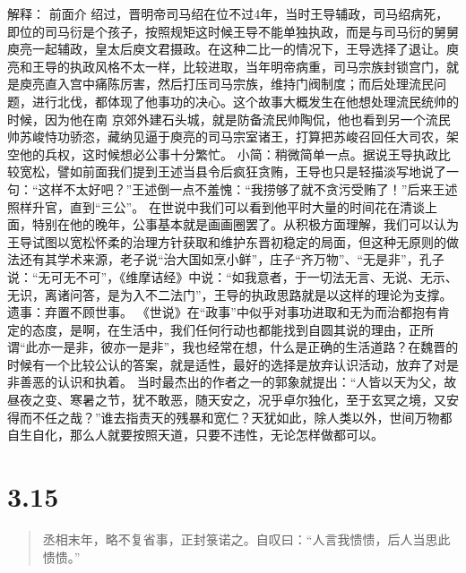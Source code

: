 \documentclass[]{book}
\begin{document}
解释： 前面介
绍过，晋明帝司马绍在位不过4年，当时王导辅政，司马绍病死，即位的司马衍是个孩子，按照规矩这时候王导不能单独执政，而是与司马衍的舅舅庾亮一起辅政，皇太后庾文君摄政。在这种二比一的情况下，王导选择了退让。庾亮和王导的执政风格不太一样，比较进取，当年明帝病重，司马宗族封锁宫门，就是庾亮直入宫中痛陈厉害，然后打压司马宗族，维持门阀制度；而后处理流民问题，进行北伐，都体现了他事功的决心。这个故事大概发生在他想处理流民统帅的时候，因为他在南
京郊外建石头城，就是防备流民帅陶侃，他也看到另一个流民帅苏峻恃功骄恣，藏纳见逼于庾亮的司马宗室诸王，打算把苏峻召回任大司农，架空他的兵权，这时候想必公事十分繁忙。
小简：稍微简单一点。据说王导执政比较宽松，譬如前面我们提到王述当县令后疯狂贪贿，王导也只是轻描淡写地说了一句：``这样不太好吧？''王述倒一点不羞愧：``我捞够了就不贪污受贿了！''后来王述照样升官，直到``三公''。
在世说中我们可以看到他平时大量的时间花在清谈上面，特别在他的晚年，公事基本就是画画圈罢了。从积极方面理解，我们可以认为王导试图以宽松怀柔的治理方针获取和维护东晋初稳定的局面，但这种无原则的做法还有其学术来源，老子说``治大国如烹小鲜''，庄子``齐万物''、``无是非''，孔子说：``无可无不可''，《维摩诘经》中说：``如我意者，于一切法无言、无说、无示、无识，离诸问答，是为入不二法门''，王导的执政思路就是以这样的理论为支撑。
遗事：弃置不顾世事。
《世说》在``政事''中似乎对事功进取和无为而治都抱有肯定的态度，是啊，在生活中，我们任何行动也都能找到自圆其说的理由，正所谓``此亦一是非，彼亦一是非''，我也经常在想，什么是正确的生活道路？在魏晋的时候有一个比较公认的答案，就是适性，最好的选择是放弃认识活动，放弃了对是非善恶的认识和执着。
当时最杰出的作者之一的郭象就提出：``人皆以天为父，故昼夜之变、寒暑之节，犹不敢恶，随天安之，况乎卓尔独化，至于玄冥之境，又安得而不任之哉？''谁去指责天的残暴和宽仁？天犹如此，除人类以外，世间万物都自生自化，那么人就要按照天道，只要不违性，无论怎样做都可以。

\section{3.15}\label{section-169}

\begin{quote}
丞相末年，略不复省事，正封箓诺之。自叹曰：``人言我愦愦，后人当思此愦愦。''
\end{quote}
\end{document}
